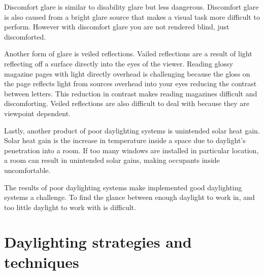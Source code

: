 Discomfort glare is similar to disability glare but less dangerous. Discomfort glare is also caused from a bright glare source that makes a visual task more difficult to perform. However with discomfort glare you are not rendered blind, just discomforted.

Another form of glare is veiled reflections.
Vailed reflections are a result of light reflecting off a surface directly into the eyes of the viewer. Reading glossy magazine pages with light directly overhead is challenging because the gloss on the page reflects light from sources overhead into your eyes reducing the contrast between letters. This reduction in contrast makes reading magazines difficult and discomforting.
Veiled reflections are also difficult to deal with because they are viewpoint dependent.

Lastly, another product of poor daylighting systems is unintended solar heat gain. Solar heat gain is the increase in temperature inside a space due to daylight's penetration into a room. If too many windows are installed in particular location, a room can result in unintended solar gains, making occupants inside uncomfortable.

The results of poor daylighting systems make implemented good daylighting systems a challenge. To find the glance between enough daylight to work in, and too little daylight to work with is difficult.


\section{Daylighting strategies and techniques}

